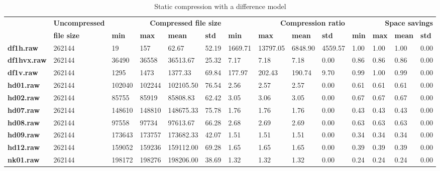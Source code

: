 \begin{table}
\centering
\footnotesize
\begin{tabular}{l|l|llll|llll|llll}
    & \textbf{Uncompressed} & \multicolumn{4}{r|}{\textbf{Compressed file size}} & \multicolumn{4}{r|}{\textbf{Compression ratio}} & \multicolumn{4}{r}{\textbf{Space savings}} \\
    & \textbf{file size} & \textbf{min} & \textbf{max} & \textbf{mean} & \textbf{std} & \textbf{min} & \textbf{max} & \textbf{mean} & \textbf{std} & \textbf{min} & \textbf{max} & \textbf{mean} & \textbf{std} \\
\hline
    \textbf{df1h.raw} & 262144 & 19 & 157 & 62.67 & 52.19 & 1669.71 & 13797.05 & 6848.90 & 4559.57 & 1.00 & 1.00 & 1.00 & 0.00 \\
    \textbf{df1hvx.raw} & 262144 & 36490 & 36558 & 36513.67 & 25.32 & 7.17 & 7.18 & 7.18 & 0.00 & 0.86 & 0.86 & 0.86 & 0.00 \\
    \textbf{df1v.raw} & 262144 & 1295 & 1473 & 1377.33 & 69.84 & 177.97 & 202.43 & 190.74 & 9.70 & 0.99 & 1.00 & 0.99 & 0.00 \\
    \textbf{hd01.raw} & 262144 & 102040 & 102244 & 102105.50 & 76.54 & 2.56 & 2.57 & 2.57 & 0.00 & 0.61 & 0.61 & 0.61 & 0.00 \\
    \textbf{hd02.raw} & 262144 & 85755 & 85919 & 85808.83 & 62.42 & 3.05 & 3.06 & 3.05 & 0.00 & 0.67 & 0.67 & 0.67 & 0.00 \\
    \textbf{hd07.raw} & 262144 & 148610 & 148810 & 148675.33 & 75.78 & 1.76 & 1.76 & 1.76 & 0.00 & 0.43 & 0.43 & 0.43 & 0.00 \\
    \textbf{hd08.raw} & 262144 & 97558 & 97734 & 97613.67 & 66.28 & 2.68 & 2.69 & 2.69 & 0.00 & 0.63 & 0.63 & 0.63 & 0.00 \\
    \textbf{hd09.raw} & 262144 & 173643 & 173757 & 173682.33 & 42.07 & 1.51 & 1.51 & 1.51 & 0.00 & 0.34 & 0.34 & 0.34 & 0.00 \\
    \textbf{hd12.raw} & 262144 & 159052 & 159236 & 159112.00 & 69.28 & 1.65 & 1.65 & 1.65 & 0.00 & 0.39 & 0.39 & 0.39 & 0.00 \\
    \textbf{nk01.raw} & 262144 & 198172 & 198276 & 198206.00 & 38.69 & 1.32 & 1.32 & 1.32 & 0.00 & 0.24 & 0.24 & 0.24 & 0.00 \\
\end{tabular}
\caption{Static compression with a difference model}
\end{table}
